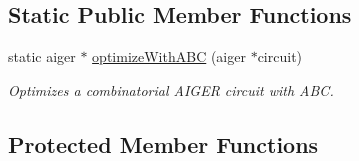 \subsection*{Static Public Member Functions}
\begin{DoxyCompactItemize}
\item 
static aiger $\ast$ \hyperlink{classCNFImplExtractor_ad21828d816dfdbf672f6e595589ef6e7}{optimize\-With\-A\-B\-C} (aiger $\ast$circuit)
\begin{DoxyCompactList}\small\item\em Optimizes a combinatorial A\-I\-G\-E\-R circuit with A\-B\-C. \end{DoxyCompactList}\end{DoxyCompactItemize}
\subsection*{Protected Member Functions}
